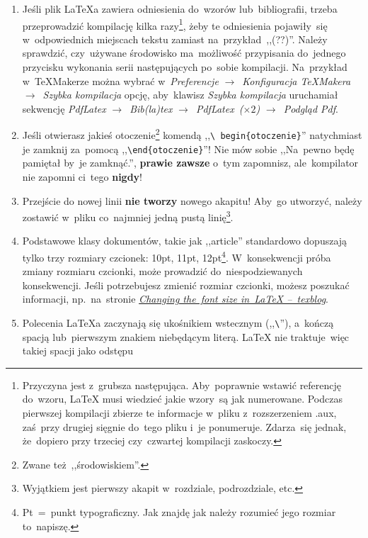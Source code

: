 \documentclass[a4paper,11pt]{article}
\newcommand{\tbs}{\textbackslash}  %
\newcommand{\tb}{\textbf}
\begin{document}
\begin{enumerate}
\item Jeśli plik \LaTeX a zawiera odniesienia do~wzorów
  lub~bibliografii, trzeba przeprowadzić kompilację kilka
  razy\footnote{Przyczyna jest z~grubsza następująca. Aby~poprawnie
    wstawić referencję do~wzoru, \LaTeX{} musi wiedzieć jakie wzory~są
    jak numerowane. Podczas pierwszej kompilacji zbierze te informacje
    w~pliku z~rozszerzeniem .aux, zaś~przy drugiej sięgnie do~tego
    pliku i~je ponumeruje. Zdarza~się jednak, że~dopiero przy trzeciej
    czy~czwartej kompilacji zaskoczy.}, żeby te odniesienia
  pojawiły~się w~odpowiednich miejscach tekstu zamiast
  na~przykład~,,(??)''. Należy sprawdzić, czy~używane środowisko
  ma~możliwość przypisania do~jednego przycisku wykonania serii
  następujących po~sobie kompilacji. Na~przykład w~\TeX Makerze można
  wybrać w~\emph{Preferencje} $\to$~\emph{Konfiguracja \TeX Makera}
  $\to$~\emph{Szybka kompilacja} opcję, aby~klawisz \emph{Szybka
    kompilacja} uruchamiał sekwencję \emph{PdfLatex}
  $\to$~\emph{Bib(la)tex} $\to$~\emph{PdfLatex~($\times 2$)}
  $\to$~\emph{Podgląd Pdf}.
\item Jeśli otwierasz jakieś otoczenie\footnote{Zwane
    też~,,środowiskiem''.} komendą ,,\texttt{\tbs
    begin\{otoczenie\}}'' natychmiast je zamknij za~pomocą
  ,,\texttt{\tbs end\{otoczenie\}}''! Nie mów sobie ,,Na~pewno będę
  pamiętał by~je zamknąć.'', \tb{prawie zawsze} o~tym zapomnisz,
  ale~kompilator nie zapomni ci~tego \tb{nigdy}!
\item Przejście do nowej linii \tb{nie tworzy} nowego akapitu! Aby~go
  utworzyć, należy zostawić w~pliku co~najmniej jedną pustą
  linię\footnote{Wyjątkiem jest pierwszy akapit w~rozdziale,
    podrozdziale, etc.}.
\item Podstawowe klasy dokumentów, takie jak ,,article'' standardowo
  dopuszają tylko trzy rozmiary czcionek: 10pt, 11pt,
  12pt\footnote{Pt~=~punkt typograficzny. Jak znajdę jak należy
    rozumieć jego rozmiar to~napiszę.}. W~konsekwencji próba zmiany
  rozmiaru czcionki, może prowadzić do~niespodziewanych konsekwencji.
  Jeśli potrzebujesz zmienić rozmiar czcionki, możesz poszukać
  informacji, np.~na~stronie
  \href{https://texblog.org/2012/08/29/changing-the-font-size-in-latex/}{\emph{Changing
      the~font size in~LaTeX --~texblog}}.
\item Polecenia \LaTeX a zaczynają się ukośnikiem wstecznym
  (,,\texttt{\tbs}''), a~kończą spacją lub~pierwszym znakiem niebędącym
  literą. \LaTeX{} nie traktuje~więc takiej spacji jako odstępu

\end{enumerate}
\end{document}
